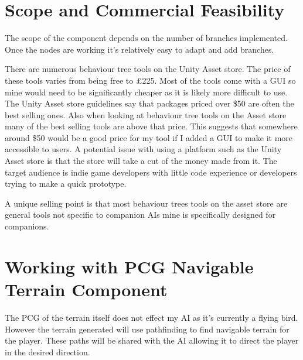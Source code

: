 \documentclass{scrartcl}
\begin{document}
\section{Scope and Commercial Feasibility}
The scope of the component depends on the number of branches implemented. Once the nodes are working it's relatively easy to adapt and add branches.

There are numerous behaviour tree tools on the Unity Asset store. The price of these tools varies from being free to \pounds225. Most of the tools come with a GUI so mine would need to be significantly cheaper as it is likely more difficult to use.
The Unity Asset store guidelines say that packages priced over \$50 are often the best selling ones. Also when looking at behaviour tree tools on the Asset store many of the best selling tools are above that price. This suggests that somewhere around \$50 would be a good price for my tool if I added a GUI to make it more accessible to users.  A potential issue with using a platform such as the Unity Asset store is that the store will take a cut of the money made from it.
The target audience is indie game developers with little code experience or developers trying to make a quick prototype.
\bigskip

A unique selling point is that most behaviour trees tools on the asset store are general tools not specific to companion AIs mine is specifically designed for companions. 


\section{ Working with PCG Navigable Terrain Component }
The PCG of the terrain itself does not effect my AI as it's currently a flying bird. However the terrain generated will use pathfinding to find navigable terrain for the player. These paths will be shared with the AI allowing it  to direct the player in the desired direction. 



	
\end{document}
